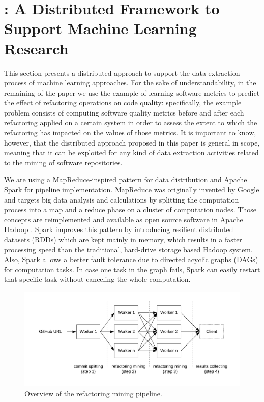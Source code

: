 
\section{\iris: A Distributed Framework to Support Machine Learning Research}
\label{sec:approach}

This section presents a distributed approach to support the data extraction process of machine learning approaches. For the sake of understandability, in the remaining of the paper we use the example of learning software metrics to predict the effect of refactoring operations on code quality: specifically, the example problem consists of computing software quality metrics before and after each refactoring applied on a certain system in order to assess the extent to which the refactoring has impacted on the values of those metrics. It is important to know, however, that the distributed approach proposed in this paper is general in scope, meaning that it can be exploited for any kind of data extraction activities related to the mining of software repositories. 

We are using a MapReduce-inspired pattern for data distribution and Apache Spark for pipeline implementation. MapReduce was originally invented by Google and targets big data analysis and calculations by splitting the computation process into a map and a reduce phase \cite{mapreduce2008} on a cluster of computation nodes. Those concepts are reimplemented and available as open source software in Apache Hadoop \cite{hadoop}. Spark improves this pattern by introducing resilient distributed datasets (RDDs) which are kept mainly in memory, which results in a faster processing speed than the traditional, hard-drive storage based Hadoop system. Also, Spark allows a better fault tolerance due to directed acyclic graphs (DAGs) for computation tasks. In case one task in the graph fails, Spark can easily restart that specific task without canceling the whole computation.

\begin{figure}
\centering
\includegraphics[scale=0.6]{pipeline}
\caption{Overview of the refactoring mining pipeline.}
\end{figure}

